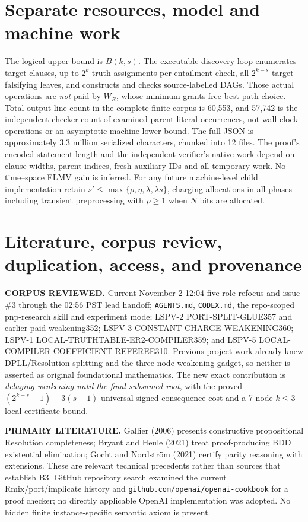 \documentclass[11pt]{article}
\begin{document}
\section*{Separate resources, model and machine work}
The logical upper bound is $B(k,s)$. The executable discovery loop enumerates target clauses, up to $2^k$ truth assignments per entailment check, all $2^{k-s}$ target-falsifying leaves, and constructs and checks source-labelled DAGs. Those actual operations are \emph{not} paid by $W_R$, whose minimum grants free best-path choice. Total output line count in the complete finite corpus is 60,553, and 57,742 is the independent checker count of examined parent-literal occurrences, not wall-clock operations or an asymptotic machine lower bound. The full JSON is approximately 3.3 million serialized characters, chunked into 12 files. The proof's encoded statement length and the independent verifier's native work depend on clause widths, parent indices, fresh auxiliary IDs and all temporary work. No time--space FLMV gain is inferred. For any future machine-level child implementation retain $s'\le\max\{\rho,\eta,\lambda,\lambda s\}$, charging allocations in all phases including transient preprocessing with $\rho\ge1$ when $N$ bits are allocated.

\section*{Literature, corpus review, duplication, access, and provenance}
\noindent\textbf{CORPUS REVIEWED.} Current November 2 12:04 five-role refocus and issue \#3 through the 02:56 PST lead handoff; \texttt{AGENTS.md}, \texttt{CODEX.md}, the repo-scoped pnp-research skill and experiment mode; LSPV-2 PORT-SPLIT-GLUE357 and earlier paid weakening352; LSPV-3 CONSTANT-CHARGE-WEAKENING360; LSPV-1 LOCAL-TRUTHTABLE-ER2-COMPILER359; and LSPV-5 LOCAL-COMPILER-COEFFICIENT-REFEREE310. Previous project work already knew DPLL/Resolution splitting and the three-node weakening gadget, so neither is asserted as original foundational mathematics. The new exact contribution is \emph{delaying weakening until the final subsumed root}, with the proved $(2^{k-s}-1)+3(s-1)$ universal signed-consequence cost and a 7-node $k\le3$ local certificate bound.

\noindent\textbf{PRIMARY LITERATURE.} Gallier (2006) presents constructive propositional Resolution completeness; Bryant and Heule (2021) treat proof-producing BDD existential elimination; Gocht and Nordstr\"om (2021) certify parity reasoning with extensions. These are relevant technical precedents rather than sources that establish B3. GitHub repository search examined the current Rmix/port/implicate history and \texttt{github.com/openai/openai-cookbook} for a proof checker; no directly applicable OpenAI implementation was adopted. No hidden finite instance-specific semantic axiom is present.
\end{document}
